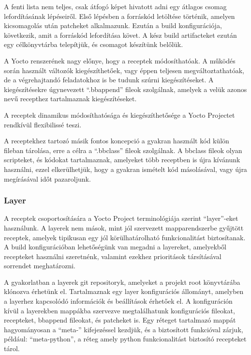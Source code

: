 A fenti lista nem teljes, csak átfogó képet hivatott adni egy átlagos csomag
lefordításának lépéseiről. Első lépésben a forráskód letöltése történik, amelyen
kicsomagolás után patcheket alkalmazunk. Ezután a build konfigurációja,
következik, amit a forráskód lefordítása követ. A kész build artifacteket ezután
egy célkönyvtárba telepítjük, és csomagot készítünk belőlük. 

A Yocto renszerének nagy előnye, hogy a receptek módosíthatóak. A működés során
használt változók kiegészíthetőek, vagy éppen teljesen megváltoztathatóak, de a
végrehajtandó feladatokhoz is be tudunk szúrni kiegészítéseket. A
kiegészítésekre úgynevezett ``.bbappend'' fileok szolgálnak, amelyek a velük
azonos nevű recepthez tartalmaznak kiegészítéseket.

A receptek dinamikus módosíthatósága és kiegészíthetősége a Yocto Projectet
rendkívül flexibilissé teszi.

\medskip

A receptekhez tartozó másik fontos koncepció a gyakran használt kód külön fileban
tárolása, erre a célra a ``.bbclass'' fileok szolgálnak. A bbclass fileok olyan
scripteket, és kódokat tartalmaznak, amelyeket több receptben is újra kívánunk
használni, ezzel elkerülhetjük, hogy a gyakran ismételt kód másolásával, vagy
újra megírásával időt pazaroljunk.

\subsubsection{Layer}

A receptek csoportosítására a Yocto Project terminológiája szerint ``layer''-eket
használunk. A layerek nem mások, mint jól szervezett mapparendszerbe gyűjtött
receptek, amelyek tipikusan egy jól körülhatárolható funkcionalitást
biztosítanak. A build konfigurációban lehetőségünk van megadni a layereket,
amelyekből recepteket használni szeretnénk, valamint ezekhez prioritások
társításával sorrendet meghatározni.

A gyakorlatban a layerek git repositoryk, amelyeket a projekt root könyvtárába
klónozva érhetünk el. Tartalmaznak egy layer konfigurációs állományt, amelyben a
layerhez kapcsolódó információk és beállítások érhetőek el. A konfiguráción kívül
a layerekben mappákba szervezve megtalálhatunk konfigurációs fileokat,
recepteket, bbappend fileokat, és patcheket is. Egy réteget tartalmazó mappát
hagyományosan a ``meta-'' kifejezéssel kezdjük, és a biztosított funkcióval
zárjuk, például: ``meta-python'', a réteg amely python funkcionalitást biztosító
recepteket tárol. 

